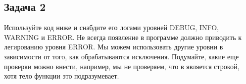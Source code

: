\documentclass[letterpaper,10pt,russian]{sphinxmanual}
\begin{document}
\subsection{Задача 2}
\label{\detokenize{educational_materials/logging/exercises:id3}}
\sphinxAtStartPar
Используйте код ниже и снабдите его логами уровней DEBUG, INFO, WARNING и ERROR. Не всегда появление  в программе должно приводить к легированию уровня ERROR. Мы можем использовать другие уровни в зависимости от того, как обрабатываются исключения. Подумайте, какие еще проверки можно внести, например, мы не проверяем, что  в  является строкой, хотя тело функции это подразумевает.

\begin{sphinxVerbatim}[commandchars=\\\{\}]

 
            
              
             
     
         
       
         

 
      

      
     

  
            
       


\end{sphinxVerbatim}
\end{document}
